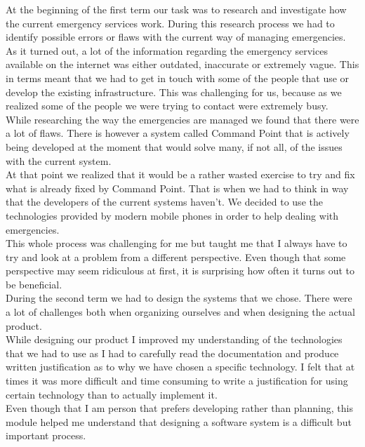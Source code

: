 \documentclass[]{article}
\begin{document}
At the beginning of the first term our task was to research and investigate how the current emergency services work. During this research process we had to identify possible errors or flaws with the current way of managing emergencies.\\ 

As it turned out, a lot of the information regarding the emergency services available on the internet was either outdated, inaccurate or extremely vague. This in terms meant that we had to get in touch with some of the people that use or develop the existing infrastructure. This was challenging for us, because as we realized some of the people we were trying to contact were extremely busy.\\

While researching the way the emergencies are managed we found that there were a lot of flaws. There is however a system called Command Point that is actively being developed at the moment that would solve many, if not all, of the issues with the current system.\\

At that point we realized that it would be a rather wasted exercise to try and fix what is already fixed by Command Point. That is when we had to think in way that the developers of the current systems haven’t.  We decided to use the technologies provided by modern mobile phones in order to help dealing with emergencies.\\

This whole process was challenging for me but taught me that I always have to try and look at a problem from a different perspective. Even though that some perspective may seem ridiculous at first, it is surprising how often it turns out to be beneficial.\\

During the second term we had to design the systems that we chose. There were a lot of challenges both when organizing ourselves and when designing the actual product. \\

While designing our product I improved my understanding of the technologies that we had to use as I had to carefully read the documentation and produce written justification as to why we have chosen a specific technology. I felt that at times it was more difficult and time consuming to write a justification for using certain technology than to actually implement it.\\

Even though that I am person that prefers developing rather than planning, this module helped me understand that designing a software system is a difficult but important process.\\
\end{document}
